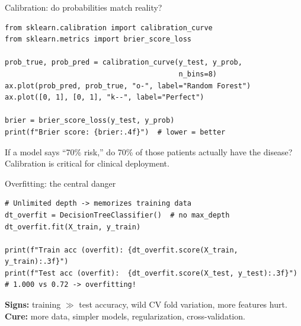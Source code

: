 \documentclass[aspectratio=169,11pt]{beamer}
\begin{document}
\begin{frame}[fragile]{Calibration: do probabilities match reality?}
\begin{verbatim}
from sklearn.calibration import calibration_curve
from sklearn.metrics import brier_score_loss

prob_true, prob_pred = calibration_curve(y_test, y_prob,
                                         n_bins=8)
ax.plot(prob_pred, prob_true, "o-", label="Random Forest")
ax.plot([0, 1], [0, 1], "k--", label="Perfect")

brier = brier_score_loss(y_test, y_prob)
print(f"Brier score: {brier:.4f}")  # lower = better
\end{verbatim}

\vspace{4pt}
If a model says ``70\% risk,'' do 70\% of those patients actually have the disease? \alert{Calibration is critical for clinical deployment.}
\end{frame}

\begin{frame}[fragile]{Overfitting: the central danger}
\begin{verbatim}
# Unlimited depth -> memorizes training data
dt_overfit = DecisionTreeClassifier()  # no max_depth
dt_overfit.fit(X_train, y_train)

print(f"Train acc (overfit): {dt_overfit.score(X_train, y_train):.3f}")
print(f"Test acc (overfit):  {dt_overfit.score(X_test, y_test):.3f}")
# 1.000 vs 0.72 -> overfitting!
\end{verbatim}

\vspace{4pt}
\textbf{Signs:} training $\gg$ test accuracy, wild CV fold variation, more features hurt.\\
\textbf{Cure:} more data, simpler models, regularization, cross-validation.
\end{frame}
\end{document}

